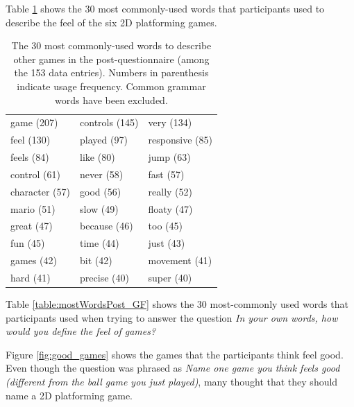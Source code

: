 Table \ref{table:mostWordsPost} shows the 30 most commonly-used words that participants used to describe the feel of the six 2D platforming games.

\begin{table} \centering
\caption{The 30 most commonly-used words to describe other games in the post-questionnaire (among the 153 data entries). Numbers in parenthesis indicate usage frequency. Common grammar words have been excluded.}
\label{table:mostWordsPost}
\begin{tabular}{lll}
\toprule
game (207) & controls (145) & very (134)\\
feel (130) & played (97) & responsive (85)\\
feels (84) & like (80) & jump (63)\\
control (61) & never (58) & fast (57)\\
character (57) & good (56) & really (52)\\
mario (51) & slow (49) & floaty (47)\\
great (47) & because (46) & too (45)\\
fun (45) & time (44) & just (43)\\
games (42) & bit (42) & movement (41)\\
hard (41) & precise (40) & super (40)\\
\bottomrule
\end{tabular}
\end{table}

Table \ref{table:mostWordsPost_GF} shows the 30 most-commonly used words that participants used when trying to answer the question \textit{In your own words, how would you define the feel of games?}

Figure \ref{fig:good_games} shows the games that the participants think feel good. Even though the question was phrased as \textit{Name one game you think feels good (different from the ball game you just played)}, many thought that they should name a 2D platforming game.

